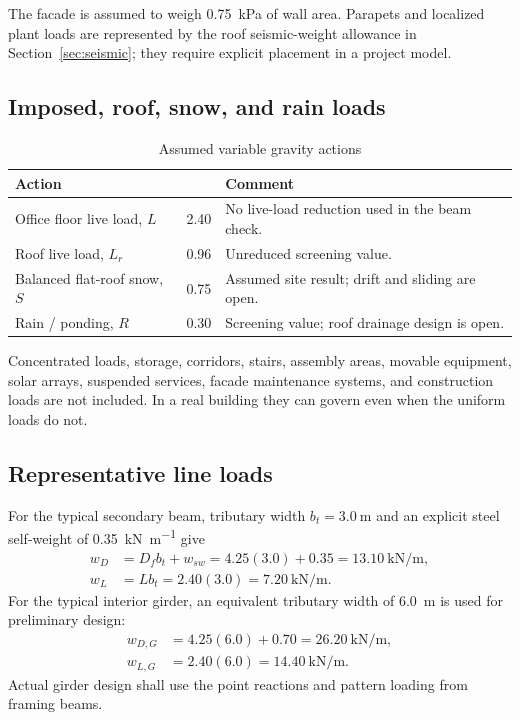 The facade is assumed to weigh \SI{0.75}{\kilo\pascal} of wall area. Parapets and
localized plant loads are represented by the roof seismic-weight allowance in
Section~\ref{sec:seismic}; they require explicit placement in a project model.

\subsection{Imposed, roof, snow, and rain loads}
\begin{table}[htbp]
\centering
\caption{Assumed variable gravity actions}
\begin{tabularx}{\textwidth}{@{}Y R{31mm}Y@{}}
  \toprule
  \textbf{Action} &  & \textbf{Comment} \\
  \midrule
  Office floor live load, $L$ & 2.40 & No live-load reduction used in the beam check. \\
  Roof live load, $L_r$ & 0.96 & Unreduced screening value. \\
  Balanced flat-roof snow, $S$ & 0.75 & Assumed site result; drift and sliding are open. \\
  Rain / ponding, $R$ & 0.30 & Screening value; roof drainage design is open. \\
  \bottomrule
\end{tabularx}
\end{table}

Concentrated loads, storage, corridors, stairs, assembly areas, movable equipment,
solar arrays, suspended services, facade maintenance systems, and construction loads
are not included. In a real building they can govern even when the uniform loads do
not.

\subsection{Representative line loads}
For the typical secondary beam, tributary width $b_t=\SI{3.0}{\metre}$ and an
explicit steel self-weight of \SI{0.35}{\kilo\newton\per\metre} give
\begin{align}
  w_D &= D_f b_t + w_{sw}
       = 4.25(3.0)+0.35
       = \SI{13.10}{\kilo\newton\per\metre}, \\
  w_L &= L b_t
       = 2.40(3.0)
       = \SI{7.20}{\kilo\newton\per\metre}.
\end{align}
For the typical interior girder, an equivalent tributary width of
\SI{6.0}{\metre} is used for preliminary design:
\begin{align}
  w_{D,G} &= 4.25(6.0)+0.70
          = \SI{26.20}{\kilo\newton\per\metre}, \\
  w_{L,G} &= 2.40(6.0)
          = \SI{14.40}{\kilo\newton\per\metre}.
\end{align}
Actual girder design shall use the point reactions and pattern loading from framing
beams.


